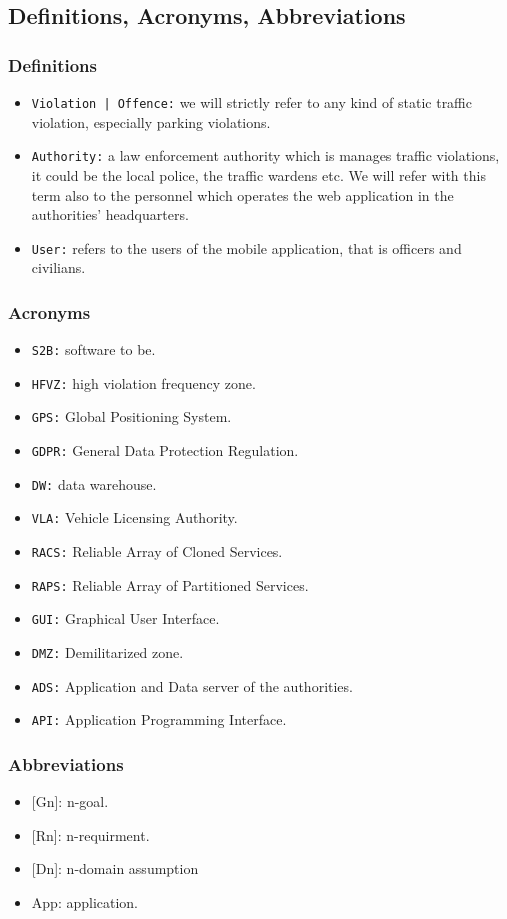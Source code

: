 \documentclass[12pt,a4paper]{article}
\begin{document}
\subsection{Definitions, Acronyms, Abbreviations}
\subsubsection{Definitions}
\begin{itemize}
\item \texttt{Violation | Offence:} we will strictly refer to any kind of static traffic violation, especially parking violations. 
\item \texttt{Authority:} a law enforcement authority which is manages traffic violations, it could be the local police, the traffic wardens etc. We will refer with this term also to the personnel which operates the web application in the authorities' headquarters.
\item \texttt{User:} refers to the users of the mobile application, that is officers and civilians.
\end{itemize}
\subsubsection{Acronyms}
\begin{itemize}
\item \texttt{S2B:} software to be.
\item \texttt{HFVZ:} high violation frequency zone.
\item \texttt{GPS:} Global Positioning System.
\item \texttt{GDPR:} General Data Protection Regulation.
\item \texttt{DW:} data warehouse.
\item \texttt{VLA:} Vehicle Licensing Authority.
\item \texttt{RACS:} Reliable Array of Cloned Services.
\item \texttt{RAPS:} Reliable Array of Partitioned Services.
\item \texttt{GUI:} Graphical User Interface.
\item \texttt{DMZ:} Demilitarized zone.
\item \texttt{ADS:} Application and Data server of the authorities.
\item \texttt{API:} Application Programming Interface.
\end{itemize}
\subsubsection{Abbreviations}
\begin{itemize}
	\item {[Gn]}: n-goal.
	\item {[Rn]}: n-requirment.
	\item {[Dn]}: n-domain assumption
	\item {App}: application.
\end{itemize}
\end{document}
